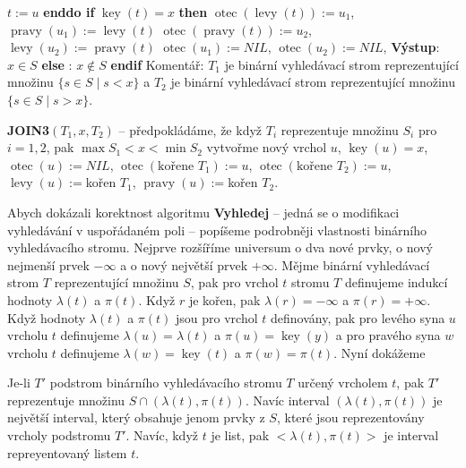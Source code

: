 \documentclass[a4paper,12pt]{article}
\DeclareMathOperator*{\otec}{otec}
\DeclareMathOperator*{\levy}{levy}
\DeclareMathOperator*{\pravy}{pravy}
\DeclareMathOperator*{\key}{key}
\begin{document}
\phantom{---}$t:=u$\newline 
{\bf enddo\newline 
if} $\key(t)=x$ {\bf then}\newline 
\phantom{---}$\otec(\levy(t)):=u_1$, $\pravy(u_1):=\levy(t)$\newline 
\phantom{---}$\otec(\pravy(t)):=u_2$, $\levy(u_2):=\pravy(t)$\newline 
\phantom{---}$\otec(u_1):=NIL$, $\otec(u_2):=NIL$, {\bf Výstup}: $x\in S$\newline 
{\bf else}\newline 
\phantom{---}{\bf Výstup}: $x\notin S$\newline 
{\bf endif\newline }
Komentář: $T_1$ je binární vyhledávací strom reprezentující 
mno\-ži\-nu 
$\{s\in S\mid s<x\}$ a $T_2$ je binární vyhledávací strom 
reprezentující množinu $\{s\in S\mid s>x\}$.

{\bf JOIN3$(T_1,x,T_2)$} -- předpokládáme, že když $
T_i$ reprezentuje 
množinu $S_i$ pro $i=1,2$, pak $\max S_1<x<\min S_2$\newline 
vytvořme nový vrchol $u$, $\key(u)=x$, $\otec(u):=NIL$, \newline 
$\otec(\text{kořene }T_1):=u$, $\otec(\text{kořene }T_2):=u$, \newline 
$\levy(u):=$kořen $T_1$, $\pravy(u):=$kořen $T_2$.

Abych dokázali korektnost algoritmu {\bf Vyhledej} -- 
jedná se o modifikaci vyhledávání v uspořádaném poli --
popíšeme po\-drobněji vlastnosti binárního vyhledávacího 
stromu. Nej\-prve rozšíříme universum o dva nové prvky, o nový 
nejmenší prvek $-\infty$ a o nový největší prvek $+\infty$. 
Mějme binární vyhledávací strom $T$ reprezentující 
množinu $S$, pak pro vrchol $t$ stromu $T$ definujeme indukcí hodnoty $\lambda(t)$ 
a $\pi(t)$. Když $r$ je kořen, pak $\lambda(r)=-\infty$ a $\pi(r)=+\infty$. 
Když hodnoty $\lambda(t)$ a $\pi(t)$ jsou pro vrchol $t$ definovány, pak pro levého syna $u$ vrcholu $t$ definujeme $\lambda(u)=\lambda(t)$ a $\pi(u)=\key(y)$
a pro pravého syna $w$ vrcholu $t$ definujeme $\lambda(w)=\key(t)$ a $\pi(w)=\pi(t)$.
Nyní dokážeme

\begin{lemma}Je-li $T'$ podstrom binárního vyhledávacího 
stromu $T$ určený vrcholem $t$, pak $T'$ reprezentuje množinu 
$S\cap (\lambda (t),\pi (t))$. Navíc interval $(\lambda (t),\pi 
(t))$ je největší interval, 
který obsahuje jenom prvky z $S$, které jsou reprezentovány 
vrcholy podstromu $T'$. Navíc, když $t$ je list, pak $<\lambda(t),\pi(t)>$ je interval repreyentovaný listem $t$.
\end{lemma}
\end{document}
